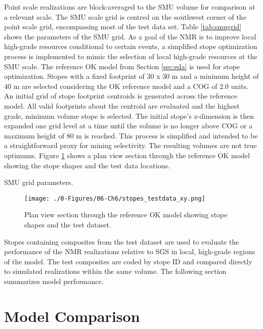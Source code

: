 Point scale realizations are block-averaged to the \gls{SMU} volume for comparison at a relevant scale. The \gls{SMU} scale grid is centred on the southwest corner of the point scale grid, encompassing most of the test data set. Table \ref{tab:smugrid} shows the parameters of the \gls{SMU} grid. As a goal of the \gls{NMR} is to improve local high-grade resources conditional to certain events, a simplified stope optimization process is implemented to mimic the selection of local high-grade resources at the \gls{SMU} scale. The reference \gls{OK} model from Section \ref{sec:eda} is used for stope optimization. Stopes with a fixed footprint of 30 x 30 m and a minimum height of 40 m are selected considering the \gls{OK} reference model and a \gls{COG} of 2.0 units. An initial grid of stope footprint centroids is generated across the reference model. All valid footprints about the centroid are evaluated and the highest grade, minimum volume stope is selected. The initial stope's z-dimension is then expanded one grid level at a time until the volume is no longer above \gls{COG} or a maximum height of 80 m is reached. This process is simplified and intended to be a straightforward proxy for mining selectivity. The resulting volumes are not true optimums. Figure \ref{fig:stopes_testdata_xy} shows a plan view section through the reference \gls{OK} model showing the stope shapes and the test data locations.

\begin{table}[!htb]
    \centering
    \caption{\Gls{SMU} grid parameters.}
    \resizebox{0.9\width}{!}{}
    \label{tab:smugrid}
\end{table}

\begin{figure}[htb!]
    \centering
    \texttt{[image: ./0-Figures/06-Ch6/stopes\_testdata\_xy.png]}
    \caption{Plan view section through the reference \gls{OK} model showing stope shapes and the test dataset. }
    \label{fig:stopes_testdata_xy}
\end{figure}

Stopes containing composites from the test dataset are used to evaluate the performance of the \gls{NMR} realizations relative to \gls{SGS} in local, high-grade regions of the model. The test composites are coded by stope ID and compared directly to simulated realizations within the same volume. The following section summarizes model performance.

\FloatBarrier
\section{Model Comparison}
\label{sec:compare}


